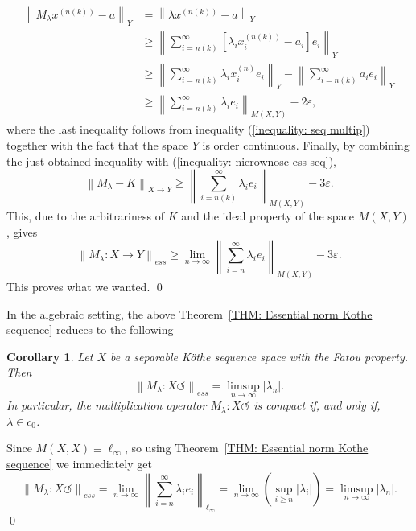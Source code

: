 \documentclass[11pt]{amsart}
\theoremstyle{definition}
\theoremstyle{definition}
\theoremstyle{definition}
\newtheorem{corollary}[theorem]{Corollary}
\theoremstyle{definition}
\theoremstyle{definition}
\theoremstyle{definition}
\theoremstyle{definition}
\theoremstyle{definition}
\numberwithin{equation}{section}
\numberwithin{equation}{section}
\numberwithin{equation}{section}
\theoremstyle{definition}
\theoremstyle{definition}
\theoremstyle{definition}
\theoremstyle{definition}
\theoremstyle{definition}
\theoremstyle{definition}
\newcommand{\norm}[1]{\left\lVert#1\right\rVert}
\newcommand{\abs}[1]{\left\lvert#1\right\rvert}
\renewenvironment{proof}{\noindent {\bf Proof.}}{\qed}
\begin{document}
\begin{proof}
\begin{align*}
		\norm{M_{\lambda} x^{(n(k))} - a}_Y
			& = \norm{\lambda x^{(n(k))} - a}_Y \\
			& \geqslant \norm{ \sum_{i = n(k)}^{\infty} \left[ \lambda_i x^{(n(k))}_i - a_i \right] e_i }_Y \\
			& \geqslant \norm{ \sum_{i = n(k)}^{\infty} \lambda_i x^{(n)}_i e_i }_Y - \norm{ \sum_{i = n(k)}^{\infty} a_i e_i }_Y \\
			& \geqslant \norm{ \sum_{i = n(k)}^{\infty} \lambda_i e_i }_{M(X,Y)} - 2\varepsilon,
	\end{align*}
	where the last inequality follows from inequality (\ref{inequality: seq multip}) together with the fact that the space $Y$ is order continuous.
	Finally, by combining the just obtained inequality with (\ref{inequality: nierownosc ess seq}),
	\begin{equation*}
		\norm{M_{\lambda} - K}_{X \rightarrow Y} \geqslant \norm{ \sum_{i=n(k)}^{\infty} \lambda_i e_i }_{M(X,Y)} - 3\varepsilon.
	\end{equation*}
	This, due to the arbitrariness of $K$ and the ideal property of the space $M(X,Y)$, gives
	\begin{equation*}
		\norm{M_{\lambda} \colon X \rightarrow Y}_{ess}
			\geqslant \lim\limits_{n \rightarrow \infty} \norm{ \sum_{i=n}^{\infty} \lambda_i e_i }_{M(X,Y)} - 3\varepsilon.
	\end{equation*}
	This proves what we wanted.
\end{proof}

In the algebraic setting, the above Theorem~\ref{THM: Essential norm Kothe sequence} reduces to the following

\begin{corollary} \label{COR: compact sequence X to X}
	{\it Let $X$ be a separable K{\" o}the sequence space with the Fatou property. Then
		\begin{equation*}
			\norm{M_{\lambda} \colon X \circlearrowleft}_{ess} = \limsup\limits_{n \rightarrow \infty} \abs{\lambda_n}.
		\end{equation*}
		In particular, the multiplication operator $M_{\lambda} \colon X \circlearrowleft$ is compact if, and only if, $\lambda \in c_0$.}
\end{corollary}
\begin{proof}
	Since $M(X,X) \equiv \ell_\infty$, so using Theorem~\ref{THM: Essential norm Kothe sequence} we immediately get
	\begin{equation*}
		\norm{M_{\lambda} \colon X \circlearrowleft}_{ess}
			= \lim\limits_{n \rightarrow \infty} \norm{ \sum_{i=n}^{\infty} \lambda_i e_i }_{\ell_\infty}
			= \lim\limits_{n \rightarrow \infty} \left( \sup\limits_{i \geqslant n} \abs{\lambda_i} \right)
			= \limsup\limits_{n \rightarrow \infty} \abs{\lambda_n}.
	\end{equation*}
\end{proof}
\end{document}
